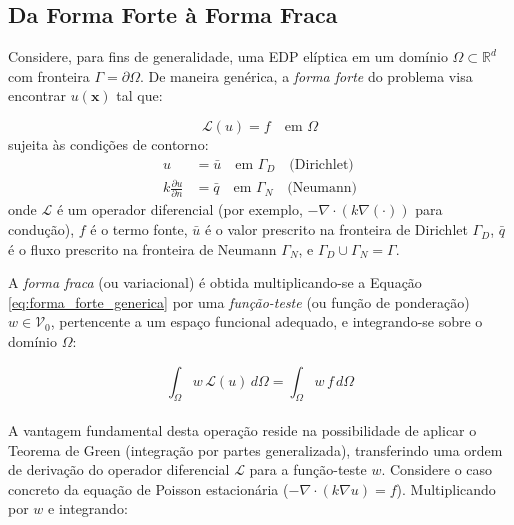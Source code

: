 \subsection{Da Forma Forte à Forma Fraca}
\label{sec:forma_fraca}

Considere, para fins de generalidade, uma EDP elíptica em um domínio $\Omega \subset \mathbb{R}^d$ com fronteira $\Gamma = \partial\Omega$. De maneira genérica, a \textit{forma forte} do problema visa encontrar $u(\mathbf{x})$ tal que:

\begin{equation}
\mathcal{L}(u) = f \quad \text{em } \Omega
\label{eq:forma_forte_generica}
\end{equation}
sujeita às condições de contorno:
\begin{align}
u &= \bar{u} \quad \text{em } \Gamma_D \quad \text{(Dirichlet)} \label{eq:cc_dirichlet} \\
k \frac{\partial u}{\partial n} &= \bar{q} \quad \text{em } \Gamma_N \quad \text{(Neumann)} \label{eq:cc_neumann}
\end{align}
onde $\mathcal{L}$ é um operador diferencial (por exemplo, $-\nabla \cdot (k \nabla (\cdot))$ para condução), $f$ é o termo fonte, $\bar{u}$ é o valor prescrito na fronteira de Dirichlet $\Gamma_D$, $\bar{q}$ é o fluxo prescrito na fronteira de Neumann $\Gamma_N$, e $\Gamma_D \cup \Gamma_N = \Gamma$.

A \textit{forma fraca} (ou variacional) é obtida multiplicando-se a Equação \ref{eq:forma_forte_generica} por uma \textit{função-teste} (ou função de ponderação) $w \in \mathcal{V}_0$, pertencente a um espaço funcional adequado, e integrando-se sobre o domínio $\Omega$:

\begin{equation}
\int_\Omega w \, \mathcal{L}(u) \, d\Omega = \int_\Omega w \, f \, d\Omega
\label{eq:residuo_ponderado}
\end{equation}

\paragraph{}A vantagem fundamental desta operação reside na possibilidade de aplicar o Teorema de Green (integração por partes generalizada), transferindo uma ordem de derivação do operador diferencial $\mathcal{L}$ para a função-teste $w$. Considere o caso concreto da equação de Poisson estacionária ($-\nabla \cdot (k \nabla u) = f$). Multiplicando por $w$ e integrando:

